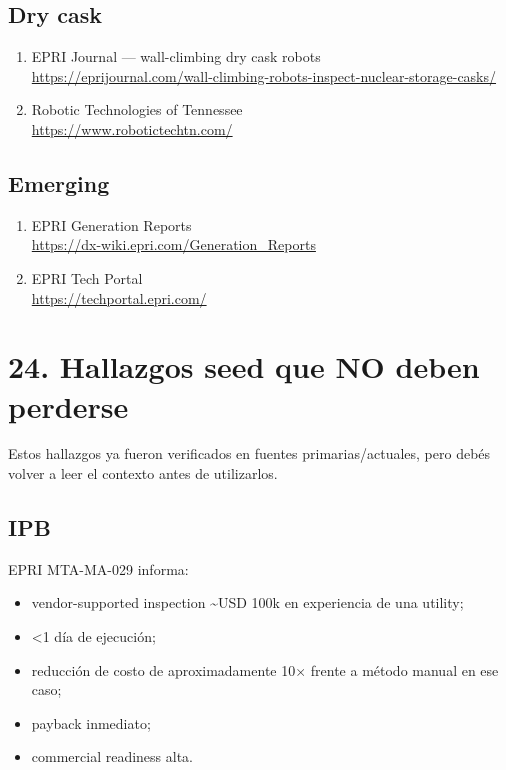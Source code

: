 \documentclass[11pt,a4paper]{article}
\begin{document}
\subsection*{Dry cask}
\begin{enumerate}[start=17]
\item EPRI Journal — wall-climbing dry cask robots \\
\url{https://eprijournal.com/wall-climbing-robots-inspect-nuclear-storage-casks/}
\item Robotic Technologies of Tennessee \\
\url{https://www.robotictechtn.com/}
\end{enumerate}


\subsection*{Emerging}
\begin{enumerate}[start=19]
\item EPRI Generation Reports \\
\url{https://dx-wiki.epri.com/Generation_Reports}
\item EPRI Tech Portal \\
\url{https://techportal.epri.com/}
\end{enumerate}


\section*{24. Hallazgos seed que NO deben perderse}
Estos hallazgos ya fueron verificados en fuentes primarias/actuales, pero debés volver a leer el contexto antes de utilizarlos.


\subsection*{IPB}
EPRI MTA-MA-029 informa:

\begin{itemize}
\item vendor-supported inspection \textasciitilde{}USD 100k en experiencia de una utility;
\item \textless{}1 día de ejecución;
\item reducción de costo de aproximadamente 10$\times$ frente a método manual en ese caso;
\item payback inmediato;
\item commercial readiness alta.
\end{itemize}
\end{document}
